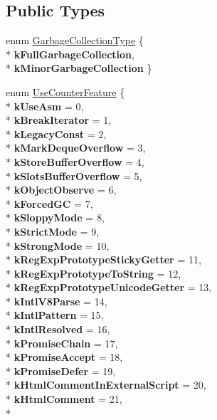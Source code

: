 \subsection*{Public Types}
\begin{DoxyCompactItemize}
\item 
enum \hyperlink{classv8_1_1_isolate_a5ae00cc99d8aca148c6f5f9698c432c9}{Garbage\+Collection\+Type} \{ \\*
{\bfseries k\+Full\+Garbage\+Collection}, 
\\*
{\bfseries k\+Minor\+Garbage\+Collection}
 \}
\item 
enum \hyperlink{classv8_1_1_isolate_aed6909379c3f2820cb3084710b73385d}{Use\+Counter\+Feature} \{ \\*
{\bfseries k\+Use\+Asm} = 0, 
\\*
{\bfseries k\+Break\+Iterator} = 1, 
\\*
{\bfseries k\+Legacy\+Const} = 2, 
\\*
{\bfseries k\+Mark\+Deque\+Overflow} = 3, 
\\*
{\bfseries k\+Store\+Buffer\+Overflow} = 4, 
\\*
{\bfseries k\+Slots\+Buffer\+Overflow} = 5, 
\\*
{\bfseries k\+Object\+Observe} = 6, 
\\*
{\bfseries k\+Forced\+GC} = 7, 
\\*
{\bfseries k\+Sloppy\+Mode} = 8, 
\\*
{\bfseries k\+Strict\+Mode} = 9, 
\\*
{\bfseries k\+Strong\+Mode} = 10, 
\\*
{\bfseries k\+Reg\+Exp\+Prototype\+Sticky\+Getter} = 11, 
\\*
{\bfseries k\+Reg\+Exp\+Prototype\+To\+String} = 12, 
\\*
{\bfseries k\+Reg\+Exp\+Prototype\+Unicode\+Getter} = 13, 
\\*
{\bfseries k\+Intl\+V8\+Parse} = 14, 
\\*
{\bfseries k\+Intl\+Pattern} = 15, 
\\*
{\bfseries k\+Intl\+Resolved} = 16, 
\\*
{\bfseries k\+Promise\+Chain} = 17, 
\\*
{\bfseries k\+Promise\+Accept} = 18, 
\\*
{\bfseries k\+Promise\+Defer} = 19, 
\\*
{\bfseries k\+Html\+Comment\+In\+External\+Script} = 20, 
\\*
{\bfseries k\+Html\+Comment} = 21, 
\\*

\end{DoxyCompactItemize}
